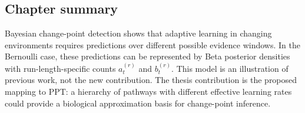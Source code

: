 \subsection{Chapter summary}
\label{sec:cpd-a-summary}

Bayesian change-point detection shows that adaptive learning in changing environments requires predictions over different possible evidence windows. In the Bernoulli case, these predictions can be represented by Beta posterior densities with run-length-specific counts \(a_t^{(r)}\) and \(b_t^{(r)}\). This model is an illustration of previous work, not the new contribution. The thesis contribution is the proposed mapping to PPT: a hierarchy of pathways with different effective learning rates could provide a biological approximation basis for change-point inference.
